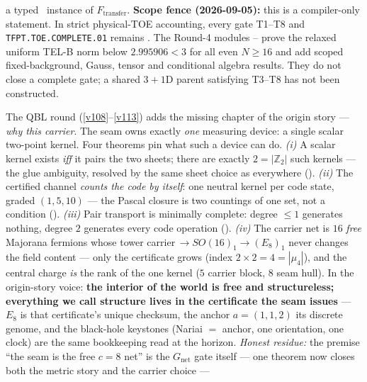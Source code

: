 \documentclass[11pt,a4paper]{article}
\newcommand{\Z}{\mathbb Z}
\begin{document}
\begin{keybox}
a typed \mC\ instance of $F_{\mathrm{transfer}}$.
\textbf{Scope fence (2026-09-05):} this is a compiler-only statement.  In strict physical-TOE
accounting, every gate T1--T8 and \texttt{TFPT.TOE.COMPLETE.01} remains \mO.
The Round-4 modules
--
prove the relaxed uniform TEL-B norm below $2.995906<3$ for all even $N\ge16$
and add scoped fixed-background, Gauss, tensor and conditional algebra results.
They do not close a complete gate; a shared $3{+}1$D parent satisfying T3--T8
has not been constructed.
\end{keybox}

\begin{keybox}
The QBL round (\vref{v108}--\vref{v113}) adds the missing chapter of the origin story --- \emph{why this carrier}. The
seam owns exactly \emph{one} measuring device: a single scalar two-point kernel. Four theorems pin what
such a device can do. \emph{(i)} A scalar kernel exists \emph{iff} it pairs the two sheets; there are
exactly $2=|\Z_2|$ such kernels --- the glue ambiguity, resolved by the same sheet choice as everywhere
(). \emph{(ii)} The certified channel \emph{counts the code by itself}:
one neutral kernel per code state, graded $(1,5,10)$ --- the Pascal closure is two countings of one set,
not a condition (). \emph{(iii)} Pair transport is minimally
complete: degree $\le1$ generates nothing, degree $2$ generates every code operation
(). \emph{(iv)} The carrier net is $16$ \emph{free} Majorana
fermions whose tower carrier$\,\to SO(16)_1\to(E_8)_1$ never changes the field content --- only the
certificate grows (index $2{\times}2=4=|\mu_4|$), and the central charge \emph{is} the rank of the one
kernel ($5$ carrier block, $8$ seam hull). In the origin-story voice: \textbf{the interior of the world
is free and structureless; everything we call structure lives in the certificate the seam issues} ---
$E_8$ is that certificate's unique checksum, the anchor $a=(1,1,2)$ its discrete genome, and the
black-hole keystones (Nariai $=$ anchor, one orientation, one clock) are the same bookkeeping read at
the horizon. \emph{Honest residue:} the premise ``the seam is the free $c{=}8$ net'' is the
$G_{\mathrm{net}}$ gate itself --- one theorem now closes both the metric story and the carrier choice ---

\end{keybox}
\end{document}

